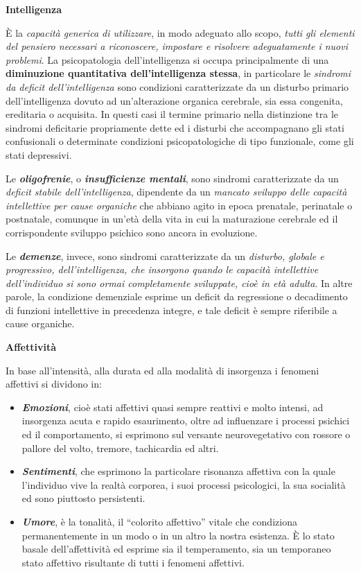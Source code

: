 \documentclass[]{article}
\begin{document}
\textbf{Intelligenza}

È la \emph{capacità generica di utilizzare}, in modo adeguato allo
scopo, \emph{tutti gli elementi del pensiero necessari a riconoscere,
impostare e risolvere adeguatamente i nuovi problemi}. La psicopatologia
dell'intelligenza si occupa principalmente di una \textbf{diminuzione
quantitativa dell'intelligenza stessa}, in particolare le \emph{sindromi
da deficit dell'intelligenza} sono condizioni caratterizzate da un
disturbo primario dell'intelligenza dovuto ad un'alterazione organica
cerebrale, sia essa congenita, ereditaria o acquisita. In questi casi il
termine primario nella distinzione tra le sindromi deficitarie
propriamente dette ed i disturbi che accompagnano gli stati confusionali
o determinate condizioni psicopatologiche di tipo funzionale, come gli
stati depressivi.

Le \textbf{\emph{oligofrenie}}, o \textbf{\emph{insufficienze mentali}},
sono sindromi caratterizzate da un \emph{deficit stabile
dell'intelligenza}, dipendente da un \emph{mancato sviluppo delle
capacità intellettive per cause organiche} che abbiano agito in epoca
prenatale, perinatale o postnatale, comunque in un'età della vita in cui
la maturazione cerebrale ed il corrispondente sviluppo psichico sono
ancora in evoluzione.

Le \textbf{\emph{demenze}}, invece, sono sindromi caratterizzate da un
\emph{disturbo, globale e progressivo, dell'intelligenza, che insorgono
quando le capacità intellettive dell'individuo si sono ormai
completamente sviluppate, cioè in età adulta}. In altre parole, la
condizione demenziale esprime un deficit da regressione o decadimento di
funzioni intellettive in precedenza integre, e tale deficit è sempre
riferibile a cause organiche.

\textbf{Affettività}

In base all'intensità, alla durata ed alla modalità di insorgenza i
fenomeni affettivi si dividono in:

\begin{itemize}
\item
  \textbf{\emph{Emozioni}}, cioè stati affettivi quasi sempre reattivi e
  molto intensi, ad insorgenza acuta e rapido esaurimento, oltre ad
  influenzare i processi psichici ed il comportamento, si esprimono sul
  versante neurovegetativo con rossore o pallore del volto, tremore,
  tachicardia ed altri.
\end{itemize}

\begin{itemize}
\item
  \textbf{\emph{Sentimenti}}, che esprimono la particolare risonanza
  affettiva con la quale l'individuo vive la realtà corporea, i suoi
  processi psicologici, la sua socialità ed sono piuttosto persistenti.
\item
  \textbf{\emph{Umore}}, è la tonalità, il ``colorito affettivo'' vitale
  che condiziona permanentemente in un modo o in un altro la nostra
  esistenza. È lo stato basale dell'affettività ed esprime sia il
  temperamento, sia un temporaneo stato affettivo risultante di tutti i
  fenomeni affettivi.
\end{itemize}
\end{document}
